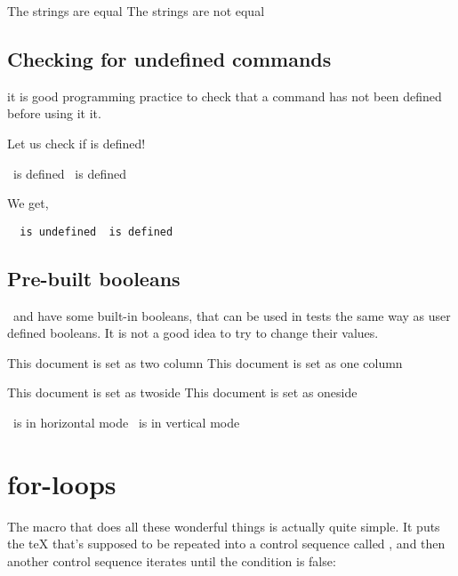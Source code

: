 \begin{teX}
\begin{teX}
\begin{teX}
\def\stringone{myname}
\def\stringtwo{myname}
\ifthenelse{\equal{\uppercase{\stringone}}{\uppercase{\stringtwo}}}
{The strings are equal}
{The strings are not equal}


\subsection{Checking for undefined commands}
it is good programming practice to check that a command has not been defined before using it it.

Let us check if  is defined!

\begin{teX}
\ifthenelse{\isundefined{\isundefined}} 
  {\string\isundefined\ is defined}
  {\string\isundefined\ is defined}
\end{teX}
\medskip

We get,

{\tt
\ifthenelse{\isundefined{\isundefined}} 
  {\string\isundefined\ is undefined}
  {\string\isundefined\ is defined}
}
\medskip


\subsection{Pre-built booleans}
\tex\ and \latex have some built-in booleans, that can be used in
tests the same way as user defined booleans. It is not a good idea
to try to change their values.

\begin{teX}
\ifthenelse{\@twocolumn}
   {This document is set as two column}
   {This document is set as one column}

\ifthenelse{\@twoside}
   {This document is set as twoside}
   {This document is set as oneside}

\ifthenelse{\hmode}
   {\tex\  is in horizontal mode}
   {\tex\  is in vertical mode}
\end{teX}



\section{for-loops}

The  macro that does all these wonderful things is actually quite simple.
It puts the  teX    that's supposed to be repeated into a control sequence called
, and then another control sequence iterates until the condition is false:


\end{teX}
\end{teX}
\end{teX}
